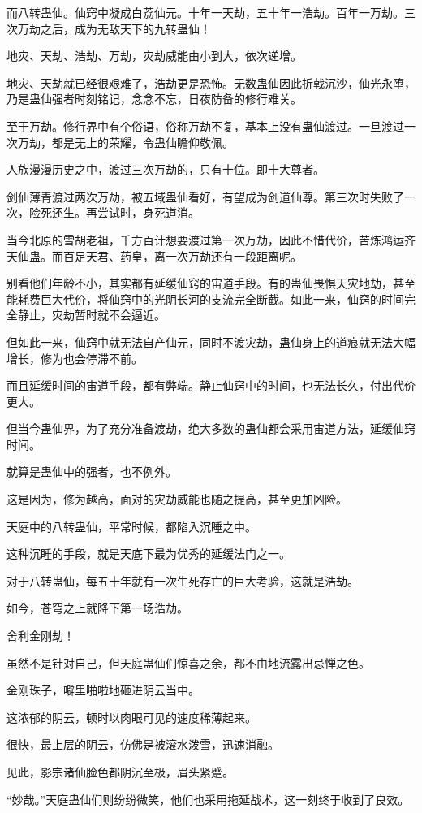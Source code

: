 \begin{this_body}
而八转蛊仙。仙窍中凝成白荔仙元。十年一天劫，五十年一浩劫。百年一万劫。三次万劫之后，成为无敌天下的九转蛊仙！

地灾、天劫、浩劫、万劫，灾劫威能由小到大，依次递增。

地灾、天劫就已经很艰难了，浩劫更是恐怖。无数蛊仙因此折戟沉沙，仙光永堕，乃是蛊仙强者时刻铭记，念念不忘，日夜防备的修行难关。

至于万劫。修行界中有个俗语，俗称万劫不复，基本上没有蛊仙渡过。一旦渡过一次万劫，都是无上的荣耀，令蛊仙瞻仰敬佩。

人族漫漫历史之中，渡过三次万劫的，只有十位。即十大尊者。

剑仙薄青渡过两次万劫，被五域蛊仙看好，有望成为剑道仙尊。第三次时失败了一次，险死还生。再尝试时，身死道消。

当今北原的雪胡老祖，千方百计想要渡过第一次万劫，因此不惜代价，苦炼鸿运齐天仙蛊。而百足天君、药皇，离一次万劫还有一段距离呢。

别看他们年龄不小，其实都有延缓仙窍的宙道手段。有的蛊仙畏惧天灾地劫，甚至能耗费巨大代价，将仙窍中的光阴长河的支流完全断截。如此一来，仙窍的时间完全静止，灾劫暂时就不会逼近。

但如此一来，仙窍中就无法自产仙元，同时不渡灾劫，蛊仙身上的道痕就无法大幅增长，修为也会停滞不前。

而且延缓时间的宙道手段，都有弊端。静止仙窍中的时间，也无法长久，付出代价更大。

但当今蛊仙界，为了充分准备渡劫，绝大多数的蛊仙都会采用宙道方法，延缓仙窍时间。

就算是蛊仙中的强者，也不例外。

这是因为，修为越高，面对的灾劫威能也随之提高，甚至更加凶险。

天庭中的八转蛊仙，平常时候，都陷入沉睡之中。

这种沉睡的手段，就是天底下最为优秀的延缓法门之一。

对于八转蛊仙，每五十年就有一次生死存亡的巨大考验，这就是浩劫。

如今，苍穹之上就降下第一场浩劫。

舍利金刚劫！

虽然不是针对自己，但天庭蛊仙们惊喜之余，都不由地流露出忌惮之色。

金刚珠子，噼里啪啦地砸进阴云当中。

这浓郁的阴云，顿时以肉眼可见的速度稀薄起来。

很快，最上层的阴云，仿佛是被滚水泼雪，迅速消融。

见此，影宗诸仙脸色都阴沉至极，眉头紧蹙。

“妙哉。”天庭蛊仙们则纷纷微笑，他们也采用拖延战术，这一刻终于收到了良效。


\end{this_body}
